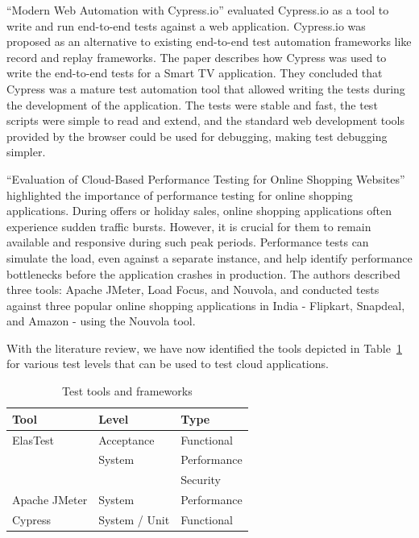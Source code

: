 \documentclass[conference]{IEEEtran}
\begin{document}
\enquote{Modern Web Automation with Cypress.io} evaluated Cypress.io\cite{cypress-website} as a tool to write and run end-to-end tests
against a web application\cite{jyolsna2022modern}.
Cypress.io was proposed as an alternative to existing end-to-end test automation frameworks like record and replay
frameworks\cite{jyolsna2022modern}.
The paper describes how Cypress was used to write the end-to-end tests for a Smart TV application.
They concluded that Cypress was a mature test automation tool that allowed writing the tests during
the development of the application\cite{jyolsna2022modern}.
The tests were stable and fast, the test scripts were simple to read and extend, and the standard web development tools
provided by the browser could be used for debugging, making test debugging simpler\cite{jyolsna2022modern}.

\enquote{Evaluation of Cloud-Based Performance Testing for Online Shopping Websites} highlighted the importance of
performance testing for online shopping applications.
During offers or holiday sales, online shopping applications often experience sudden traffic bursts.
However, it is crucial for them to remain available and responsive during such peak periods.
Performance tests can simulate the load, even against a separate instance, and help identify performance bottlenecks
before the application crashes in production.
The authors described three tools: Apache JMeter, Load Focus, and Nouvola, and conducted tests against three popular online
shopping applications in India - Flipkart, Snapdeal, and Amazon - using the Nouvola tool.

With the literature review, we have now identified the tools depicted in Table~\ref{tab:test-tools-and-frameworks}
for various test levels that can be used to test cloud applications.

\begin{table}[h]
	\centering
	\begin{tabular}{| l | l | l |}
		\toprule
		\textbf{Tool}                            & \textbf{Level} & \textbf{Type} \\
		\midrule
		ElasTest\cite{bertolino2019systematic}   & Acceptance     & Functional    \\
		                                         & System         & Performance   \\
		                                         &                & Security      \\
		\midrule
		Apache JMeter\cite{janani2015evaluation} & System         & Performance   \\
		\midrule
		Cypress\cite{mobaraya2019technical}      & System / Unit  & Functional    \\
		\midrule
	\end{tabular}
	\caption{Test tools and frameworks}
	\label{tab:test-tools-and-frameworks}
\end{table}
\end{document}
